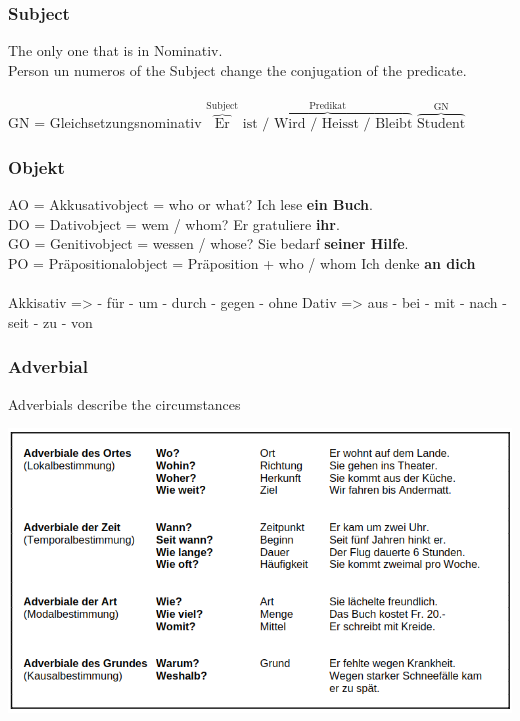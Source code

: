 \subsubsection{Subject}
\newcommand\textover[2]{$\overbrace{\text{#1}}^{\text{#2}}$}

The only one that is in Nominativ.\\
Person un numeros of the Subject change the conjugation of the predicate.\\
\\
GN = Gleichsetzungsnominativ \arrow \textover{Er}{Subject} \textover{ist / Wird / Heisst / Bleibt}{Predikat} \textover{Student}{GN}\\

\subsubsection{Objekt}

AO = Akkusativobject = who or what? \arrow Ich lese \textbf{ein Buch}.\\
DO = Dativobject = wem / whom? \arrow Er gratuliere \textbf{ihr}.\\
GO = Genitivobject = wessen / whose? \arrow Sie bedarf \textbf{seiner Hilfe}.\\
PO = Präpositionalobject = Präposition + who / whom \arrow Ich denke \textbf{an dich}\\
\\
Akkisativ => - für - um - durch - gegen - ohne
Dativ => aus - bei - mit - nach - seit - zu - von

\subsubsection{Adverbial}

Adverbials describe the circumstances

\includegraphics[width=\textwidth]{./german/imgs/adverbial.png}

